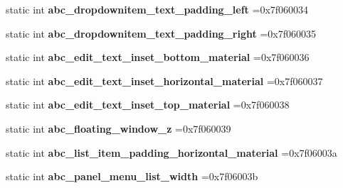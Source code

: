 \begin{DoxyCompactItemize}
static int {\bfseries abc\+\_\+dropdownitem\+\_\+text\+\_\+padding\+\_\+left} =0x7f060034
\item 
\mbox{\label{classandroid_1_1support_1_1v7_1_1cardview_1_1R_1_1dimen_ae27959813ffaee8713c7aeab4a6fe7e7}} 
static int {\bfseries abc\+\_\+dropdownitem\+\_\+text\+\_\+padding\+\_\+right} =0x7f060035
\item 
\mbox{\label{classandroid_1_1support_1_1v7_1_1cardview_1_1R_1_1dimen_ad494eaba5d9c70926207f34adb09262e}} 
static int {\bfseries abc\+\_\+edit\+\_\+text\+\_\+inset\+\_\+bottom\+\_\+material} =0x7f060036
\item 
\mbox{\label{classandroid_1_1support_1_1v7_1_1cardview_1_1R_1_1dimen_af1c6043edbb824e79ecb69a479fb0b8e}} 
static int {\bfseries abc\+\_\+edit\+\_\+text\+\_\+inset\+\_\+horizontal\+\_\+material} =0x7f060037
\item 
\mbox{\label{classandroid_1_1support_1_1v7_1_1cardview_1_1R_1_1dimen_aa3c4702c5f14428d2ccd8449c22885a5}} 
static int {\bfseries abc\+\_\+edit\+\_\+text\+\_\+inset\+\_\+top\+\_\+material} =0x7f060038
\item 
\mbox{\label{classandroid_1_1support_1_1v7_1_1cardview_1_1R_1_1dimen_ac1d88313163b6237aeb8a7a56a43f161}} 
static int {\bfseries abc\+\_\+floating\+\_\+window\+\_\+z} =0x7f060039
\item 
\mbox{\label{classandroid_1_1support_1_1v7_1_1cardview_1_1R_1_1dimen_aed7c6c123ce305e67ba065f5519fa3d1}} 
static int {\bfseries abc\+\_\+list\+\_\+item\+\_\+padding\+\_\+horizontal\+\_\+material} =0x7f06003a
\item 
\mbox{\label{classandroid_1_1support_1_1v7_1_1cardview_1_1R_1_1dimen_adf3633c569c7d5a8e3310b960ad1598f}} 
static int {\bfseries abc\+\_\+panel\+\_\+menu\+\_\+list\+\_\+width} =0x7f06003b
\item 
\mbox{\label{classandroid_1_1support_1_1v7_1_1cardview_1_1R_1_1dimen_a8491dee29e56c470b6b530efee5b82b9}} 

\end{DoxyCompactItemize}
